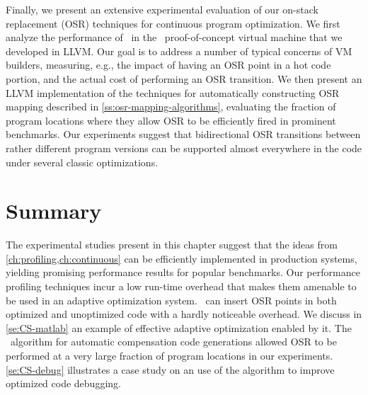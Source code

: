 Finally, we present an extensive experimental evaluation of our on-stack replacement (OSR) techniques for continuous program optimization. We first analyze the performance of \osrkit\ in the \tinyvm\ proof-of-concept virtual machine that we developed in LLVM. Our goal is to address a number of typical concerns of VM builders, measuring, e.g., the impact of having an OSR point in a hot code portion, and the actual cost of performing an OSR transition. We then present an LLVM implementation of the techniques for automatically constructing OSR mapping described in \mysection\ref{ss:osr-mapping-algorithms}, evaluating the fraction of program locations where they allow OSR to be efficiently fired in prominent benchmarks. Our experiments suggest that bidirectional OSR transitions between rather different program versions can be supported almost everywhere in the code under several classic optimizations.

\ifdefined \noauthorea



\fi

\section{Summary}
The experimental studies present in this chapter suggest that the ideas from \mychapter\ref{ch:profiling,ch:continuous} can be efficiently implemented in production systems, yielding promising performance results for popular benchmarks. Our performance profiling techniques incur a low run-time overhead that makes them amenable to be used in an adaptive optimization system. \osrkit\ can insert OSR points in both optimized and unoptimized code with a hardly noticeable overhead. We discuss in \mysection\ref{se:CS-matlab} an example of effective adaptive optimization enabled by it. The \buildcomp\ algorithm for automatic compensation code generations allowed OSR to be performed at a very large fraction of program locations in our experiments. \mysection\ref{se:CS-debug} illustrates a case study on an use of the algorithm to improve optimized code debugging.

